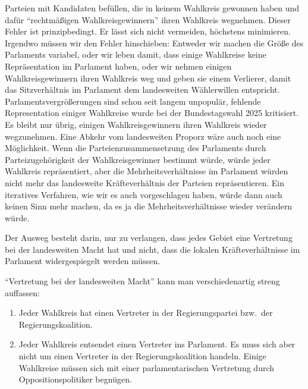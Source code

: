 Parteien mit Kandidaten befüllen, die in keinem Wahlkreis gewonnen haben und dafür
\enquote{rechtmäßigen Wahlkreisgewinnern} ihren Wahlkreis wegnehmen. Dieser Fehler ist
prinzipbedingt. Er lässt sich nicht vermeiden, höchstens minimieren. Irgendwo müssen wir den
Fehler hinschieben: Entweder wir machen die Größe des Parlaments variabel, oder wir leben damit,
dass einige Wahlkreise keine Repräsentation im Parlament haben, oder wir nehmen einigen
Wahlkreisgewinnern ihren Wahlkreis weg und geben sie einem Verlierer, damit das Sitzverhältnis im
Parlament dem landesweiten Wählerwillen entspricht. Parlamentsvergrößerungen sind schon seit
langem unpopulär, fehlende Representation einiger Wahlkreise wurde bei der Bundestagswahl 2025
kritisiert. Es bleibt nur übrig, einigen Wahlkreisgewinnern ihren Wahlkreis wieder wegzunehmen.
Eine Abkehr vom landesweiten Proporz wäre auch noch eine Möglichkeit. Wenn die
Parteienzusammensetzung des Parlaments durch Parteizugehörigkeit der Wahlkreisgewinner bestimmt
würde, würde jeder Wahlkreis repräsentiert, aber die Mehrheitsverhältnisse im Parlament würden
nicht mehr das landesweite Kräfteverhältnis der Parteien repräsentieren. Ein iteratives
Verfahren, wie wir es auch vorgeschlagen haben, würde dann auch keinen Sinn mehr machen, da es
ja die Mehrheitsverhältnisse wieder verändern würde.

Der Ausweg besteht darin, nur zu verlangen, dass jedes Gebiet eine Vertretung bei der
landesweiten Macht hat und nicht, dass die lokalen Kräfteverhältnisse im Parlament
widergespiegelt werden müssen.



\enquote{Vertretung bei der landesweiten Macht} kann man verschiedenartig streng auffassen:
\begin{enumerate}[label=\alph*)]
  \item Jeder Wahlkreis hat einen Vertreter in der Regierungspartei bzw.\ der
    Regierungskoalition.
  \item Jeder Wahlkreis entsendet einen Vertreter ins Parlament. Es muss sich aber nicht um einen
    Vertreter in der Regierungskoalition handeln. Einige Wahlkreise müssen sich mit einer
    parlamentarischen Vertretung durch Oppositionspolitiker begnügen.
\end{enumerate}

